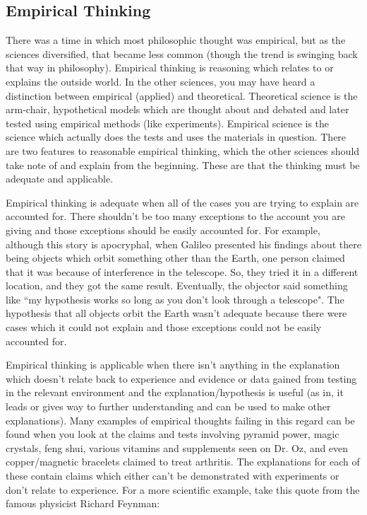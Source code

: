 \subsection{Empirical Thinking}

There was a time in which most philosophic thought was empirical, but as the sciences diversified, that became less common (though the trend is swinging back that way in philosophy). Empirical thinking is reasoning which relates to or explains the outside world. In the other sciences, you may have heard a distinction between empirical (applied) and theoretical. Theoretical science is the arm-chair, hypothetical models which are thought about and debated and later tested using empirical methods (like experiments). Empirical science is the science which actually does the tests and uses the materials in question. There are two features to reasonable empirical thinking, which the other sciences should take note of and explain from the beginning. These are that the thinking must be adequate and applicable.

Empirical thinking is adequate when all of the cases you are trying to explain are accounted for. There shouldn't be too many exceptions to the account you are giving and those exceptions should be easily accounted for. For example, although this story is apocryphal, when Galileo presented his findings about there being objects which orbit something other than the Earth, one person claimed that it was because of interference in the telescope. So, they tried it in a different location, and they got the same result. Eventually, the objector said something like ``my hypothesis works so long as you don't look through a telescope". The hypothesis that all objects orbit the Earth wasn't adequate because there were cases which it could not explain and those exceptions could not be easily accounted for. 

Empirical thinking is applicable when there isn't anything in the explanation which doesn't relate back to experience and evidence or data gained from testing in the relevant environment and the explanation/hypothesis is useful (as in, it leads or gives way to further understanding and can be used to make other explanations). Many examples of empirical thoughts failing in this regard can be found when you look at the claims and tests involving pyramid power, magic crystals, feng shui, various vitamins and supplements seen on Dr. Oz, and even copper/magnetic bracelets claimed to treat arthritis. The explanations for each of these contain claims which either can't be demonstrated with experiments or don't relate to experience. For a more scientific example, take this quote from the famous physicist Richard Feynman:

